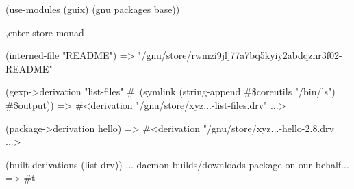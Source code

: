\documentclass{beamer}
\begin{document}
\begin{frame}[fragile]
  \begin{semiverbatim}
(\alert{use-modules} (guix) (gnu packages base))

\alert{,enter-store-monad}

(interned-file "README")
=> "/gnu/store/rwmzi9jlj77a7bq5kyiy2abdqznr3f02-README"

(gexp->derivation "list-files"
  \#~(symlink (string-append \#\$coreutils "/bin/ls")
             \#\$output))
=> \#<derivation "/gnu/store/xyz\textrm{...}-list-files\alert{.drv}" \textrm{...}>

(package->derivation hello)
=> \#<derivation "/gnu/store/xyz\textrm{...}-hello-2.8\alert{.drv} \textrm{...}>

(built-derivations (list drv))
\textsf{\alert{... daemon builds/downloads package on our behalf...}}
=> \#t

  \end{semiverbatim}

\end{frame}



\end{document}
